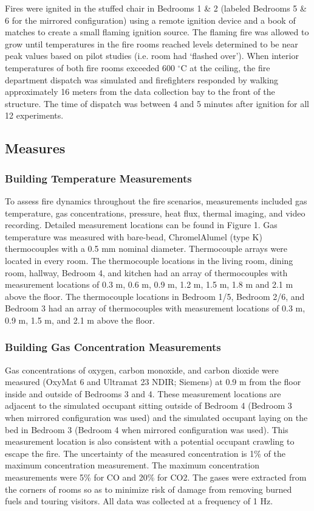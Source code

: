 \documentclass[12pt,oneside]{book}
\begin{document}
Fires were ignited in the stuffed chair in Bedrooms 1 \& 2 (labeled Bedrooms 5 \& 6 for the mirrored configuration) using a remote ignition device and a book of matches to create a small flaming ignition source.  The flaming fire was allowed to grow until temperatures in the fire rooms reached levels determined to be near peak values based on pilot studies (i.e. room had ‘flashed over').  When interior temperatures of both fire rooms exceeded 600 $^{\circ}$C at the ceiling, the fire department dispatch was simulated and firefighters responded by walking approximately 16 meters from the data collection bay to the front of the structure.  The time of dispatch was between 4 and 5 minutes after ignition for all 12 experiments.  

\subsection{Measures}

\subsubsection{Building Temperature Measurements}
To assess fire dynamics throughout the fire scenarios, measurements included gas temperature, gas concentrations, pressure, heat flux, thermal imaging, and video recording. Detailed measurement locations can be found in Figure 1.  
Gas temperature was measured with bare-bead, ChromelAlumel (type K) thermocouples with a 0.5 mm nominal diameter. Thermocouple arrays were located in every room. The thermocouple locations in the living room, dining room, hallway, Bedroom 4, and kitchen had an array of thermocouples with measurement locations of 0.3 m, 0.6 m, 0.9 m, 1.2 m, 1.5 m, 1.8 m and 2.1 m above the floor. The thermocouple locations in Bedroom 1/5, Bedroom 2/6, and Bedroom 3 had an array of thermocouples with measurement locations of 0.3 m, 0.9 m, 1.5 m, and 2.1 m above the floor. 

\subsubsection{Building Gas Concentration Measurements}
Gas concentrations of oxygen, carbon monoxide, and carbon dioxide were measured (OxyMat 6 and Ultramat 23 NDIR; Siemens) at 0.9 m from the floor inside and outside of Bedrooms 3 and 4.   These measurement locations are adjacent to the simulated occupant sitting outside of Bedroom 4 (Bedroom 3 when mirrored configuration was used) and the simulated occupant laying on the bed in Bedroom 3 (Bedroom 4 when mirrored configuration was used).  This measurement location is also consistent with a potential occupant crawling to escape the fire.  The uncertainty of the measured concentration is 1\% of the maximum concentration measurement. The maximum concentration measurements were 5\% for CO and 20\% for CO2. The gases were extracted from the corners of rooms so as to minimize risk of damage from removing burned fuels and touring visitors. All data was collected at a frequency of 1 Hz. 
\end{document}
